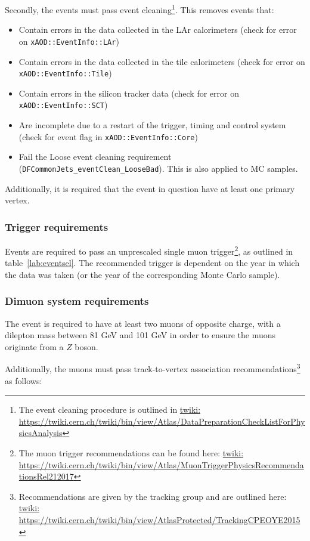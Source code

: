 Secondly, the events must pass event cleaning\footnote{The event cleaning procedure is outlined in \url{twiki: https://twiki.cern.ch/twiki/bin/view/Atlas/DataPreparationCheckListForPhysicsAnalysis}}. This removes events that:
\begin{itemize}
    \setlength{\itemsep}{1pt}
    \setlength{\parskip}{0pt}
    \setlength{\parsep}{0pt}
    \item Contain errors in the data collected in the LAr calorimeters (check for error on \texttt{xAOD::EventInfo::LAr})
    \item Contain errors in the data collected in the tile calorimeters (check for error on \texttt{xAOD::EventInfo::Tile})
    \item Contain errors in the silicon tracker data (check for error on \texttt{xAOD::EventInfo::SCT})
    \item Are incomplete due to a restart of the trigger, timing and control system (check for event flag in \texttt{xAOD::EventInfo::Core})
    \item Fail the Loose event cleaning requirement (\texttt{DFCommonJets\_eventClean\_LooseBad}). This is also applied to MC samples.
\end{itemize}

Additionally, it is required that the event in question have at least one primary vertex.

\subsubsection{Trigger requirements}
\label{subsubsec:trigger}
Events are required to pass an unprescaled single muon trigger\footnote{The muon trigger recommendations can be found here: \url{twiki: https://twiki.cern.ch/twiki/bin/view/Atlas/MuonTriggerPhysicsRecommendationsRel212017}}, as outlined in table~\ref{lab:eventsel}.
The recommended trigger is dependent on the year in which the data was taken (or the year of the corresponding Monte Carlo sample).

\subsubsection{Dimuon system requirements}
\label{subsubsec:TTVA_selection}
The event is required to have at least two muons of opposite charge, with a dilepton mass between 81 GeV and 101 GeV in order to ensure the muons originate from a $Z$ boson.

Additionally, the muons must pass track-to-vertex association recommendations\footnote{Recommendations are given by the tracking group and are outlined here: \url{twiki: https://twiki.cern.ch/twiki/bin/view/AtlasProtected/TrackingCPEOYE2015}} as follows:

